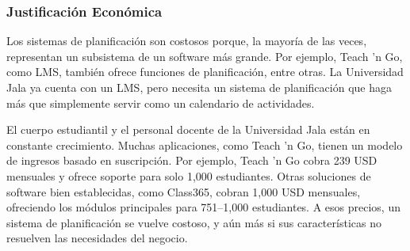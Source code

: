 \subsubsection{Justificación Económica}
Los sistemas de planificación son costosos porque, la mayoría de las veces, representan un subsistema de un software más grande.
Por ejemplo, Teach 'n Go, como LMS, también ofrece funciones de planificación, entre otras.
La Universidad Jala ya cuenta con un LMS, pero necesita un sistema de planificación que haga más que simplemente servir como un calendario de actividades.

El cuerpo estudiantil y el personal docente de la Universidad Jala están en constante crecimiento.
Muchas aplicaciones, como Teach 'n Go, tienen un modelo de ingresos basado en suscripción.
Por ejemplo, Teach 'n Go cobra 239 USD mensuales y ofrece soporte para solo 1,000 estudiantes.
Otras soluciones de software bien establecidas, como Class365, cobran 1,000 USD mensuales, ofreciendo los módulos principales para 751–1,000 estudiantes.
A esos precios, un sistema de planificación se vuelve costoso, y aún más si sus características no resuelven las necesidades del negocio.
